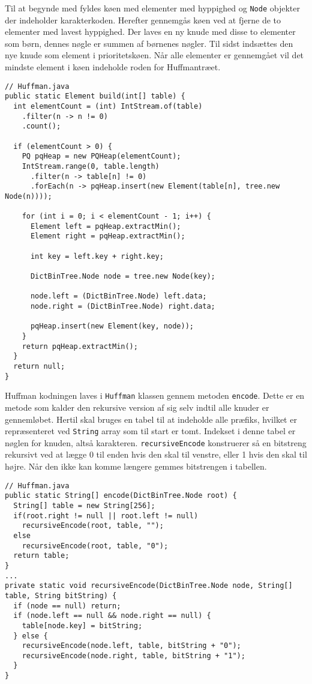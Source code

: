 \documentclass{article}
\begin{document}
Til at begynde med fyldes køen med elementer med hyppighed og \texttt{Node} objekter der indeholder karakterkoden. Herefter gennemgås køen ved at fjerne de to elementer med lavest hyppighed. Der laves en ny knude med disse to elementer som børn, dennes nøgle er summen af børnenes nøgler. Til sidst indsættes den nye knude som element i prioritetskøen. Når alle elementer er gennemgået vil det mindste element i køen indeholde roden for Huffmantræet.
\begin{lstlisting}
// Huffman.java
public static Element build(int[] table) {
  int elementCount = (int) IntStream.of(table)
    .filter(n -> n != 0)
    .count();
		
  if (elementCount > 0) {
    PQ pqHeap = new PQHeap(elementCount);
    IntStream.range(0, table.length)
      .filter(n -> table[n] != 0)
      .forEach(n -> pqHeap.insert(new Element(table[n], tree.new Node(n))));

    for (int i = 0; i < elementCount - 1; i++) {
      Element left = pqHeap.extractMin();
      Element right = pqHeap.extractMin();
	
      int key = left.key + right.key;

      DictBinTree.Node node = tree.new Node(key);
			
      node.left = (DictBinTree.Node) left.data;
      node.right = (DictBinTree.Node) right.data;
            
      pqHeap.insert(new Element(key, node));
    }
    return pqHeap.extractMin();
  }
  return null;
}
\end{lstlisting}
Huffman kodningen laves i \texttt{Huffman} klassen gennem metoden \texttt{encode}. Dette er en metode som kalder den rekursive version af sig selv indtil alle knuder er gennemløbet. Hertil skal bruges en tabel til at indeholde alle præfiks, hvilket er repræsenteret ved \texttt{String} array som til start er tomt. Indekset i denne tabel er nøglen for knuden, altså karakteren. \texttt{recursiveEncode} konstruerer så en bitstreng rekursivt ved at lægge 0 til enden hvis den skal til venstre, eller 1 hvis den skal til højre. Når den ikke kan komme længere gemmes bitstrengen i tabellen.

\begin{lstlisting}
// Huffman.java
public static String[] encode(DictBinTree.Node root) {
  String[] table = new String[256];
  if(root.right != null || root.left != null)
    recursiveEncode(root, table, "");
  else
    recursiveEncode(root, table, "0");
  return table;
}
...
private static void recursiveEncode(DictBinTree.Node node, String[] table, String bitString) {
  if (node == null) return;
  if (node.left == null && node.right == null) {
    table[node.key] = bitString;
  } else {
    recursiveEncode(node.left, table, bitString + "0");
    recursiveEncode(node.right, table, bitString + "1");
  }
}
\end{lstlisting}
\end{document}
